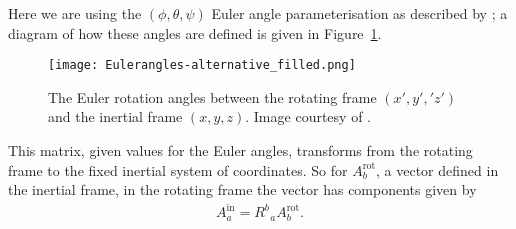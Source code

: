 \documentclass[../full_thesis/full_thesis.tex]{subfiles}
\begin{document}
Here we are using the
$(\phi, \theta, \psi)$ Euler
angle parameterisation as described by \citet{Landau1969}; a diagram of how
these angles are defined is given in Figure~\ref{fig: Euler}.\begin{figure}[ht]
\centering
\texttt{[image: Eulerangles-alternative\_filled.png]}
\caption{The Euler rotation angles between the rotating
frame $(x', y', 'z')$ and the inertial frame $(x, y, z)$. Image courtesy of
 \citet{WikipediaEuler}.}
\label{fig: Euler}
\end{figure}
This matrix, given values for the Euler angles, transforms from the rotating
frame to the fixed inertial system of coordinates. So for $A^{\textrm{rot}}_b$,
a vector defined in the inertial frame, in the rotating frame the vector has
components given by
\begin{align}
A^{\textrm{in}}_{a} = R^{b}_{\;\;a} A^{\textrm{rot}}_{b}.
\end{align}
\end{document}
